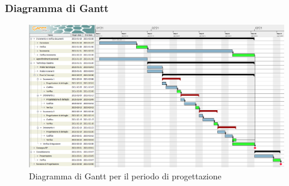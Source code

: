 \subsubsection{Diagramma di Gantt}

\begin{figure}[H]
\centering

\centerline{\includegraphics[scale=0.5]{res/Pianificazione/Gantt/progettazione}}
\caption{Diagramma di Gantt per il periodo di progettazione}
\end{figure}